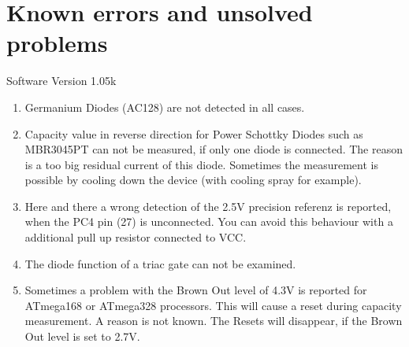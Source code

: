 
\chapter{Known errors and unsolved problems}
{\center Software Version 1.05k}

\begin{enumerate}

\item Germanium Diodes (AC128) are not detected in all cases.

\item Capacity value in reverse direction for Power Schottky Diodes such as MBR3045PT can not be measured,
if only one diode is connected. The reason is a too big residual current of this diode.
Sometimes the measurement is possible by cooling down the device (with  cooling spray for example).

\item Here and there  a wrong detection of the 2.5V precision referenz is reported, when the PC4 pin (27) is unconnected.
You can avoid this behaviour with a additional pull up resistor connected to VCC.

\item The diode function of a triac gate can not be examined.

\item Sometimes a problem with the Brown Out level of 4.3V is reported for ATmega168 or ATmega328 processors.
This will cause a reset during capacity measurement. A reason is not known.
The Resets will disappear, if the Brown Out level is set to 2.7V.

\end{enumerate}
